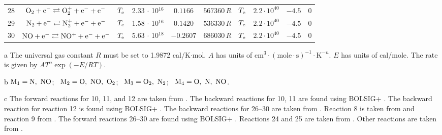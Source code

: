 \documentclass{warpdoc}
\begin{document}
\begin{table}[t]
\begin{center}
\begin{threeparttable}
\begin{tabular}{cccccccccc}
28 & $\rm O_2 + e^- \rightleftarrows O_2^+ + e^- + e^-$ &$T_{\rm e}$ & 2.33 $\cdot$ 10$^{16}$ & $0.1166$ & $567360\, R$ 
                                          &$T_{\rm e}$ & $2.2 \cdot 10^{40}$  & $-4.5$  & 0\\
29 & $\rm N_2 + e^- \rightleftarrows N_2^+ + e^- + e^-$ &$T_{\rm e}$ & 1.58 $\cdot$ 10$^{16}$ & $0.1420$ & $536330\, R$ 
                                          &$T_{\rm e}$ & $2.2 \cdot 10^{40}$  & $-4.5$  & 0\\
30 & $\rm NO + e^- \rightleftarrows NO^+ + e^- + e^-$ &$T_{\rm e}$ & 5.63 $\cdot$ 10$^{18}$ & $-0.2607$ & $686030\, R$ 
                                          &$T_{\rm e}$ & $2.2 \cdot 10^{40}$  & $-4.5$  & 0\\
\bottomrule
\end{tabular}
\begin{tablenotes}
\item[{a}] The universal gas constant $R$ must be set to 1.9872	cal/K$\cdot$mol. $A$ has units of $\textrm{cm}^3\cdot(\textrm{mole}\cdot \textrm{s})^{-1}\cdot \textrm{K}^{-n}$. $E$ has units of cal/mole. The rate is given by $A T^n \exp(-E/RT).$
\item[{b}] $\rm M_1=N,~NO$;~ $\rm M_2=O,~NO,~O_2$;~ $\rm M_3=O_2,~N_2$;~ $\rm M_4=O,~N,~NO$.
\item[{c}] The forward reactions for 10, 11, and 12 are taken from \cite{pf:2007:boyd}. The backward reactions for 10, 11 are found using BOLSIG+ \cite{psst:2005:hagelaar,jgr:1974:walls}. The backward reaction for reaction 12 is found using BOLSIG+ \cite{psst:2005:hagelaar,jap:2021:abdoulanziz}. The backward reactions for 26--30 are taken from \cite{nasa:1973:dunn}. Reaction 8 is taken from \cite{jcp:1997:bose} and reaction 9 from \cite{jcp:1996:bose}. The forward reactions 26--30 are found using BOLSIG+ \cite{psst:2005:hagelaar,pcpp:1992:morgan}. Reactions 24 and 25 are taken from \cite{jtht:1993:park}. Other reactions are taken from \cite{book:1990:park}.
\end{tablenotes}
\label{tab:parkparent}
\end{threeparttable}
\end{center}
\end{table}
%
\end{document}
